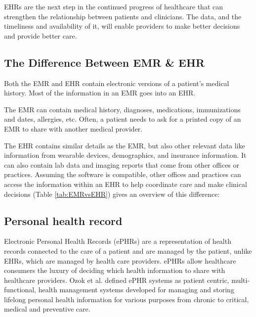 EHRs are the next step in the continued progress of healthcare that can strengthen the relationship between patients and clinicians.  The data, and the timeliness and availability of it, will enable providers to make better decisions and provide better care\cite{ElectronicHealthRecords}.


\subsection{The Difference Between EMR \& EHR}
Both the EMR and EHR contain electronic versions of a patient's medical history. Most of the information in an EMR goes into an EHR.


The EMR can contain medical history, diagnoses, medications, immunizations and dates, allergies, etc. Often, a patient needs to ask for a printed copy of an EMR to share with another medical provider.


The EHR contains similar details as the EMR, but also other relevant data like information from wearable devices, demographics, and insurance information. It can also contain lab data and imaging reports that come from other offices or practices. Assuming the software is compatible, other offices and practices can access the information within an EHR to help coordinate care and make clinical decisions\cite{KeyMaintainingMedical} (Table \ref{tab:EMRvsEHR}) gives an overview of this difference:


\newpage
\subsection{Personal health record}
Electronic Personal Health Records (ePHRs) are a representation of health records connected to the care of a patient and are managed by the patient\cite{demirisPatientcenteredApplicationsUse2008}, unlike EHRs, which are managed by health care providers. ePHRs allow healthcare consumers the luxury of deciding which health information to share with healthcare providers\cite{tangPersonalHealthRecords2006}. Ozok et al.\cite{PaperbasedComputerbasedRecords} defined ePHR systems as patient centric, multi-functional, health management systems developed for managing and storing lifelong personal health information for various purposes from chronic to critical, medical and preventive care\cite{alsahafiOverviewElectronicPersonal2018}.

